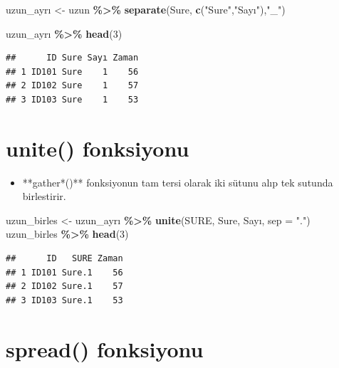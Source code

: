 \documentclass[
  oneside]{book}
\newenvironment{Shaded}{\begin{snugshade}}{\end{snugshade}}
\newcommand{\AttributeTok}[1]{\textcolor[rgb]{0.13,0.29,0.53}{#1}}
\newcommand{\DecValTok}[1]{\textcolor[rgb]{0.00,0.00,0.81}{#1}}
\newcommand{\FunctionTok}[1]{\textcolor[rgb]{0.13,0.29,0.53}{\textbf{#1}}}
\newcommand{\NormalTok}[1]{#1}
\newcommand{\OtherTok}[1]{\textcolor[rgb]{0.56,0.35,0.01}{#1}}
\newcommand{\SpecialCharTok}[1]{\textcolor[rgb]{0.81,0.36,0.00}{\textbf{#1}}}
\newcommand{\StringTok}[1]{\textcolor[rgb]{0.31,0.60,0.02}{#1}}
\providecommand{\tightlist}{%
  \setlength{\itemsep}{0pt}\setlength{\parskip}{0pt}}
\begin{document}
\begin{Shaded}
\begin{Highlighting}[]
\NormalTok{uzun\_ayrı }\OtherTok{\textless{}{-}}\NormalTok{ uzun }\SpecialCharTok{\%\textgreater{}\%} 
            \FunctionTok{separate}\NormalTok{(Sure, }\FunctionTok{c}\NormalTok{(}\StringTok{"Sure"}\NormalTok{,}\StringTok{"Sayı"}\NormalTok{),}\StringTok{"\_"}\NormalTok{) }

\NormalTok{uzun\_ayrı }\SpecialCharTok{\%\textgreater{}\%} \FunctionTok{head}\NormalTok{(}\DecValTok{3}\NormalTok{)}
\end{Highlighting}
\end{Shaded}

\begin{verbatim}
##      ID Sure Sayı Zaman
## 1 ID101 Sure    1    56
## 2 ID102 Sure    1    57
## 3 ID103 Sure    1    53
\end{verbatim}

\hypertarget{unite-fonksiyonu}{%
\section{\texorpdfstring{\textbf{unite()} fonksiyonu}{unite() fonksiyonu}}\label{unite-fonksiyonu}}

\begin{itemize}
\tightlist
\item
  **gather*()** fonksiyonun tam tersi olarak iki sütunu alıp
  tek sutunda birlestirir.
\end{itemize}

\begin{Shaded}
\begin{Highlighting}[]
\NormalTok{uzun\_birles }\OtherTok{\textless{}{-}}\NormalTok{ uzun\_ayrı }\SpecialCharTok{\%\textgreater{}\%} \FunctionTok{unite}\NormalTok{(SURE, Sure, Sayı, }\AttributeTok{sep =} \StringTok{"."}\NormalTok{)}
\NormalTok{uzun\_birles }\SpecialCharTok{\%\textgreater{}\%} \FunctionTok{head}\NormalTok{(}\DecValTok{3}\NormalTok{)}
\end{Highlighting}
\end{Shaded}

\begin{verbatim}
##      ID   SURE Zaman
## 1 ID101 Sure.1    56
## 2 ID102 Sure.1    57
## 3 ID103 Sure.1    53
\end{verbatim}

\hypertarget{spread-fonksiyonu}{%
\section{\texorpdfstring{\textbf{spread()} fonksiyonu}{spread() fonksiyonu}}\label{spread-fonksiyonu}}
\end{document}
